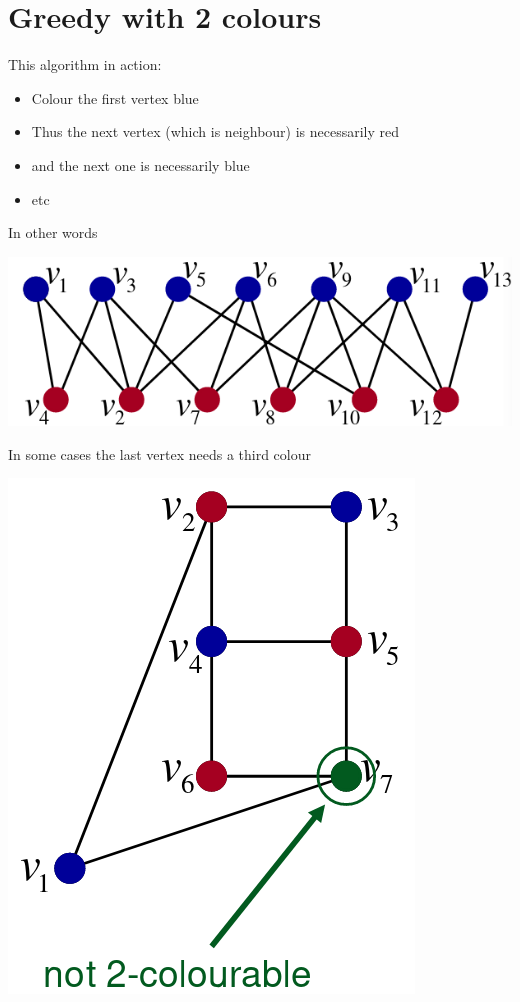 \documentclass{article}[18pt]
\begin{document}
\section{Greedy with 2 colours}
This algorithm in action:
\begin{itemize}
	\item Colour the first vertex blue
	\item Thus the next vertex (which is neighbour) is necessarily red
	\item and the next one is necessarily blue
	\item etc
\end{itemize}
In other words
\begin{center}
	\includegraphics[scale=0.7]{2_colour}
\end{center}
In some cases the last vertex needs a third colour
\begin{center}
	\includegraphics[scale=0.7]{2_colour1}
\end{center}
\end{document}
